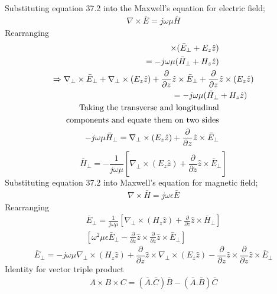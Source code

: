 Substituting equation 37.2 into the Maxwell's equation for electric field;
\begin{align*}
\nabla\times\bar{E} = j\omega\mu\bar{H}
\end{align*}
Rearranging 
\begin{align*}
[\nabla_\bot + \frac{\partial}{\partial z}\hat{z}]\times(\bar{E}_\bot + E_z\hat{z})&\\ = -j\omega\mu(\bar{H}_\bot + H_z\hat{z})&\\
\Rightarrow \nabla_\bot\times\bar{E}_\bot + \nabla_\bot\times(E_z\hat{z}) + \frac{\partial}{\partial z}\hat{z}\times\bar{E}_\bot + \frac{\partial}{\partial z}&\hat{z}\times(E_z\hat{z})\\ = -j\omega\mu(\bar{H}_\bot &+ H_z\hat{z})\\
\textnormal{Taking\ the\ transverse\ and\ longitudinal}&\\ \textnormal{components\ and\ equate\ them\ on two\ sides}&\\
-j\omega\mu\bar{H}_\bot = \nabla_\bot\times(E_z\hat{z}) + \frac{\partial}{\partial z}\hat{z}\times\bar{E}_\bot
\end{align*}
\begin{equation}
\bar{H}_\bot = -\frac{1}{j\omega\mu} [\nabla_\bot\times(E_z\hat{z}) + \frac{\partial}{\partial z}\hat{z}\times\bar{E}_\bot]
\end{equation}
Substituting equation 37.2 into Maxwell's equation for magnetic field;
\begin{align*}
\nabla\times\bar{H} = j\omega\epsilon\bar{E}
\end{align*}
Rearranging
\begin{align*}
\bar{E}_\bot = \frac{1}{j\omega\mu} [\nabla_\bot\times(H_z\hat{z}) + \frac{\partial}{\partial z}\hat{z}\times\bar{H}_\bot]\\
[\omega^2\mu\epsilon\bar{E}_\bot-\frac{\partial}{\partial z}\hat{z}\times\frac{\partial}{\partial z}\hat{z}\times\bar{E}_\bot]
\end{align*}
\begin{equation}
\bar{E}_\bot = -j\omega\mu\nabla_\bot\times(H_z\hat{z}) + \frac{\partial}{\partial z}\hat{z}\times\nabla_\bot\times(E_z\hat{z}) - \frac{\partial}{\partial z}\hat{z}\times\frac{\partial}{\partial z}\hat{z}\times\bar{E}_\bot
\end{equation}
Identity for vector triple product
\begin{align*}
A\times B\times C = (\bar{A}.\bar{C})\bar{B} - (\bar{A}.\bar{B})\bar{C}
\end{align*}
